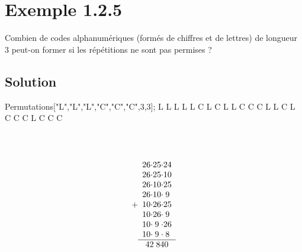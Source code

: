 \section*{Exemple 1.2.5}
	Combien de codes alphanumériques (formés de chiff{}res et de lettres) de longueur 3 peut-on former si les répétitions ne sont pas permises ?
\subsection*{Solution}
\begin{multicols}{2}
\begin{verbbox}
Permutations[{"L","L","L","C","C","C"},{3,3}];
	L	L	L
	L	L	C
	L	C	L
	L	C	C
	C	L	L
	C	L	C
	C	C	L
	C	C	C
	\end{verbbox}
	\theverbbox
	\columnbreak
	\\
	\\
	\begin{equation*}
	+\begin{array}{c @{\cdot}c @{\cdot}c}
	26&25&24\\
	26&25&10\\
	26&10&25\\
	26&10&9\\
	10&26&25\\
	10&26&9\\
	10&9&26\\
	10&9&8\\
	\hline
	\multicolumn{3}{c}{42\;840}
	\end{array}
	\end{equation*}
\end{multicols}
